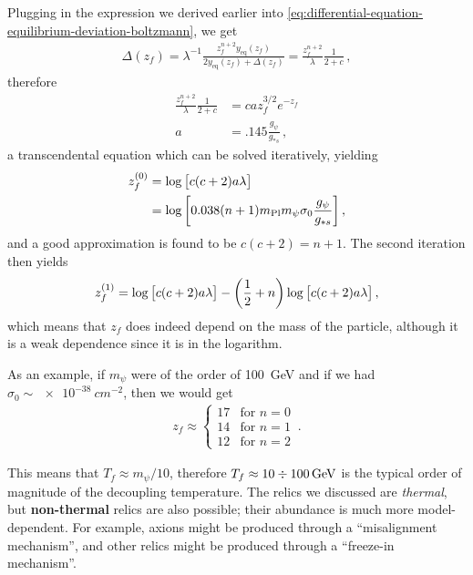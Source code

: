 \documentclass[main.tex]{subfiles}
\begin{document}
Plugging in the expression we derived earlier into \eqref{eq:differential-equation-equilibrium-deviation-boltzmann}, we get 
%
\begin{align}
\Delta(z_f) = \lambda^{-1} \frac{z_f^{n+2} y_{\text{eq}}(z_f)}{2 y _{\text{eq}}(z_f) + \Delta (z_f)} = \frac{z_f^{n+2}}{\lambda } \frac{1}{2 + c}
\,,
\end{align}
%
therefore 
%
\begin{align}
\frac{z_f^{n+2}}{\lambda } \frac{1}{2 + c}
&= c a z_f^{3/2} e^{-z_f}  \\
a &= \num{.145} \frac{g_\psi }{g_{*s}}
\,,
\end{align}
%
a transcendental equation which can be solved iteratively, yielding 
%
\begin{align}
z_f^{(0)} &= \log \qty[c (c+2) a \lambda ]  \\
&=\log \qty[\num{.038} (n+1) m _{\text{Pl}} m_\psi \sigma_0 \frac{g_\psi }{g_{*s}}]
\,,
\end{align}
%
and a good approximation is found to be \(c ( c+ 2) = n+1\). 
The second iteration then yields 
%
\begin{align}
z_f^{(1)} = \log \qty[c (c+2) a \lambda ] - \qty( \frac{1}{2} + n) \log \qty[c (c+2) a \lambda ]
\,,
\end{align}
%
which means that \(z_f\) does indeed depend on the mass of the particle, although it is a weak dependence since it is in the logarithm. 

As an example, if \(m_\psi \) were of the order of \SI{100}{GeV} and if we had \(\sigma_0 \sim \SI{e-38}{cm^{-2}}\), then we would get 
%
\begin{align}
z_f \approx \begin{cases}
    17 & \text{for } n=0 \\
    14 & \text{for } n=1 \\
    12 & \text{for } n=2 
\end{cases}
\,.
\end{align}

This means that \(T_f \approx m_\psi / 10\), therefore \(T_f \approx 10 \divisionsymbol \SI{100}{GeV}\) is the typical order of magnitude of the decoupling temperature. 
The relics we discussed are \emph{thermal}, but \textbf{non-thermal} relics are also possible; their abundance is much more model-dependent. 
For example, axions might be produced through a ``misalignment mechanism'', and other relics might be produced through a ``freeze-in mechanism''.

\end{document}
